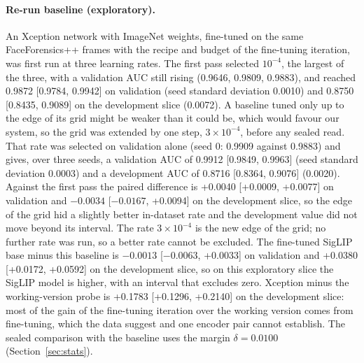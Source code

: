 \documentclass[conference,a4paper]{IEEEtran_nodash}
\begin{document}
\paragraph*{Re-run baseline (exploratory).}
An Xception network with ImageNet weights, fine-tuned on the same
FaceForensics++ frames with the recipe and budget of the fine-tuning iteration,
was first run at three learning rates. The first pass selected $10^{-4}$, the
largest of the three, with a validation AUC still rising (0.9646, 0.9809,
0.9883), and reached 0.9872 [0.9784, 0.9942] on validation (seed standard
deviation 0.0010) and 0.8750 [0.8435, 0.9089] on the development slice (0.0072).
A baseline tuned only up to the edge of its grid might be weaker than it could
be, which would favour our system, so the grid was extended by one step,
$3\times10^{-4}$, before any sealed read. That rate was selected on validation
alone (seed 0: 0.9909 against 0.9883) and gives, over three seeds, a validation
AUC of 0.9912 [0.9849, 0.9963] (seed standard deviation 0.0003) and a
development AUC of 0.8716 [0.8364, 0.9076] (0.0020). Against the first pass the
paired difference is +0.0040 [+0.0009, +0.0077] on validation and $-0.0034$
[$-0.0167$, +0.0094] on the development slice, so the edge of the grid hid a
slightly better in-dataset rate and the development value did not move beyond
its interval. The rate $3\times10^{-4}$ is the new edge of the grid; no further
rate was run, so a better rate cannot be excluded. The fine-tuned SigLIP base
minus this baseline is $-0.0013$ [$-0.0063$, +0.0033] on validation and +0.0380
[+0.0172, +0.0592] on the development slice, so on this exploratory slice the
SigLIP model is higher, with an interval that excludes zero. Xception minus the
working-version probe is +0.1783 [+0.1296, +0.2140] on the development slice:
most of the gain of the fine-tuning iteration over the working version comes
from fine-tuning, which the data suggest and one encoder pair cannot establish.
The sealed comparison with the baseline uses the margin $\delta=0.0100$
(Section~\ref{sec:stats}). %
\end{document}
